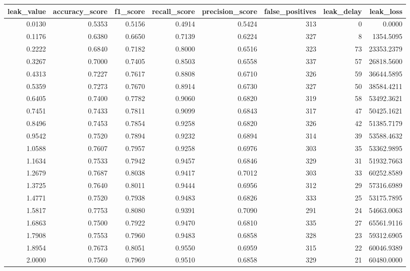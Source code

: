 \begin{tabular}{rrrrrrrr}
\toprule
leak\_value & accuracy\_score & f1\_score & recall\_score & precision\_score & false\_positives & leak\_delay & leak\_loss \\
\midrule
0.0130 & 0.5353 & 0.5156 & 0.4914 & 0.5424 & 313 & 0 & 0.0000 \\
0.1176 & 0.6380 & 0.6650 & 0.7139 & 0.6224 & 327 & 8 & 1354.5095 \\
0.2222 & 0.6840 & 0.7182 & 0.8000 & 0.6516 & 323 & 73 & 23353.2379 \\
0.3267 & 0.7000 & 0.7405 & 0.8503 & 0.6558 & 337 & 57 & 26818.5600 \\
0.4313 & 0.7227 & 0.7617 & 0.8808 & 0.6710 & 326 & 59 & 36644.5895 \\
0.5359 & 0.7273 & 0.7670 & 0.8914 & 0.6730 & 327 & 50 & 38584.4211 \\
0.6405 & 0.7400 & 0.7782 & 0.9060 & 0.6820 & 319 & 58 & 53492.3621 \\
0.7451 & 0.7433 & 0.7811 & 0.9099 & 0.6843 & 317 & 47 & 50425.1621 \\
0.8496 & 0.7453 & 0.7854 & 0.9258 & 0.6820 & 326 & 42 & 51385.7179 \\
0.9542 & 0.7520 & 0.7894 & 0.9232 & 0.6894 & 314 & 39 & 53588.4632 \\
1.0588 & 0.7607 & 0.7957 & 0.9258 & 0.6976 & 303 & 35 & 53362.9895 \\
1.1634 & 0.7533 & 0.7942 & 0.9457 & 0.6846 & 329 & 31 & 51932.7663 \\
1.2679 & 0.7687 & 0.8038 & 0.9417 & 0.7012 & 303 & 33 & 60252.8589 \\
1.3725 & 0.7640 & 0.8011 & 0.9444 & 0.6956 & 312 & 29 & 57316.6989 \\
1.4771 & 0.7520 & 0.7938 & 0.9483 & 0.6826 & 333 & 25 & 53175.7895 \\
1.5817 & 0.7753 & 0.8080 & 0.9391 & 0.7090 & 291 & 24 & 54663.0063 \\
1.6863 & 0.7500 & 0.7922 & 0.9470 & 0.6810 & 335 & 27 & 65561.9116 \\
1.7908 & 0.7553 & 0.7960 & 0.9483 & 0.6858 & 328 & 23 & 59312.6905 \\
1.8954 & 0.7673 & 0.8051 & 0.9550 & 0.6959 & 315 & 22 & 60046.9389 \\
2.0000 & 0.7560 & 0.7969 & 0.9510 & 0.6858 & 329 & 21 & 60480.0000 \\
\bottomrule
\end{tabular}
